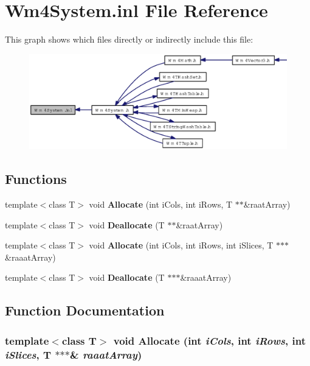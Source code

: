 \section{Wm4System.inl File Reference}
\label{Wm4System_8inl}


This graph shows which files directly or indirectly include this file:\begin{figure}[H]
\begin{center}
\leavevmode
\includegraphics[width=350pt]{Wm4System_8inl__dep__incl}
\end{center}
\end{figure}
\subsection*{Functions}
\begin{CompactItemize}
\item 
template$<$class T$>$ void {\bf Allocate} (int i\-Cols, int i\-Rows, T $\ast$$\ast$\&raat\-Array)
\item 
template$<$class T$>$ void {\bf Deallocate} (T $\ast$$\ast$\&raat\-Array)
\item 
template$<$class T$>$ void {\bf Allocate} (int i\-Cols, int i\-Rows, int i\-Slices, T $\ast$$\ast$$\ast$\&raaat\-Array)
\item 
template$<$class T$>$ void {\bf Deallocate} (T $\ast$$\ast$$\ast$\&raaat\-Array)
\end{CompactItemize}


\subsection{Function Documentation}
\subsubsection{\setlength{\rightskip}{0pt plus 5cm}template$<$class T$>$ void Allocate (int {\em i\-Cols}, int {\em i\-Rows}, int {\em i\-Slices}, T $\ast$$\ast$$\ast$\& {\em raaat\-Array})}\label{Wm4System_8inl_8e6e4cd39d7c7b5d8640d0f64102550b}



